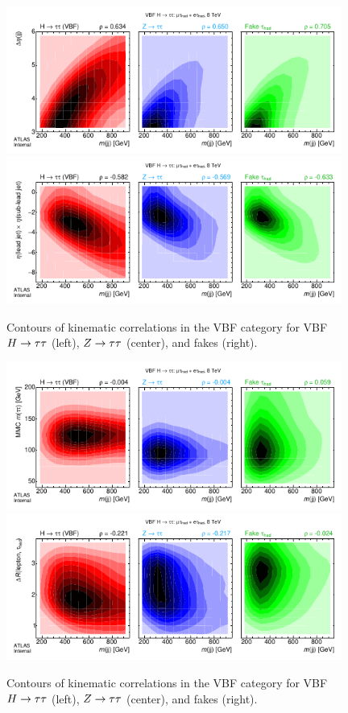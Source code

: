 \begin{figure}[tp]
  \centering
  \includegraphics[width=0.98\textwidth]{figures/kinematiccorrelations/jj_mass-vs-jj_deta}
  \includegraphics[width=0.98\textwidth]{figures/kinematiccorrelations/jj_mass-vs-jj_etaprod}
  \caption{Contours of kinematic correlations in the VBF category for VBF $H\rightarrow\tau\tau$ (left), $Z\rightarrow\tau\tau$ (center), and fakes (right).}
  \label{fig:strategy-kinematic-correlations-3}
\end{figure}

\begin{figure}[tp]
  \centering
  \includegraphics[width=0.98\textwidth]{figures/kinematiccorrelations/jj_mass-vs-mMMC}
  \includegraphics[width=0.98\textwidth]{figures/kinematiccorrelations/jj_mass-vs-taulep_dR}
  \caption{Contours of kinematic correlations in the VBF category for VBF $H\rightarrow\tau\tau$ (left), $Z\rightarrow\tau\tau$ (center), and fakes (right).}
  \label{fig:strategy-kinematic-correlations-4}
\end{figure}

